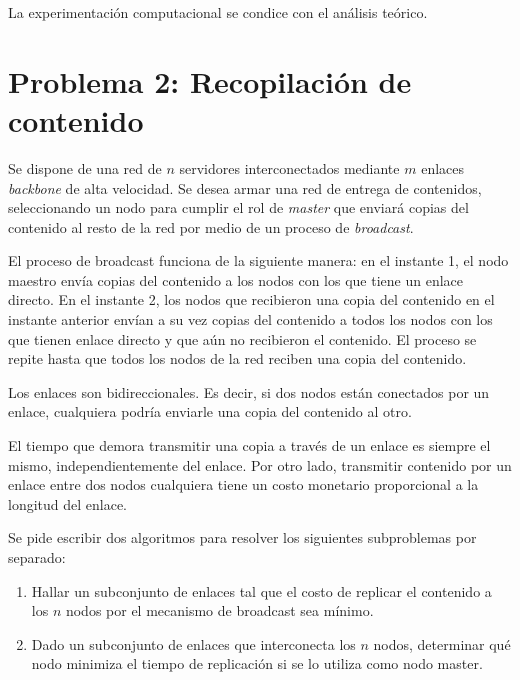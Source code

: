 \documentclass[a4paper, 10pt, twoside]{article}
\begin{document}
La experimentación computacional se condice con el análisis teórico.




\newpage

\section{Problema 2: Recopilación de contenido}

Se dispone de una red de $n$ servidores interconectados mediante $m$ enlaces \textit{backbone} de alta velocidad. Se desea armar una red de entrega de contenidos, seleccionando un nodo para cumplir el rol de \textit{master} que enviará copias del contenido al resto de la red por medio de un proceso de \textit{broadcast}.

El proceso de broadcast funciona de la siguiente manera: en el instante 1, el nodo maestro envía copias del contenido a los nodos con los que tiene un enlace directo. En el instante 2, los nodos que recibieron una copia del contenido en el instante anterior envían a su vez copias del contenido a todos los nodos con los que tienen enlace directo y que aún no recibieron el contenido. El proceso se repite hasta que todos los nodos de la red reciben una copia del contenido.

Los enlaces son bidireccionales. Es decir, si dos nodos están conectados por un enlace, cualquiera podría enviarle una copia del contenido al otro.

El tiempo que demora transmitir una copia a través de un enlace es siempre el mismo, independientemente del enlace. Por otro lado, transmitir contenido por un enlace entre dos nodos cualquiera tiene un costo monetario proporcional a la longitud del enlace.

Se pide escribir dos algoritmos para resolver los siguientes subproblemas por separado:

\begin{enumerate}
  \item{
    Hallar un subconjunto de enlaces tal que el costo de replicar el contenido a los $n$ nodos por el mecanismo de broadcast sea mínimo.
  }
  \item{
    Dado un subconjunto de enlaces que interconecta los $n$ nodos, determinar qué nodo minimiza el tiempo de replicación si se lo utiliza como nodo master.
  }
\end{enumerate}
\end{document}

